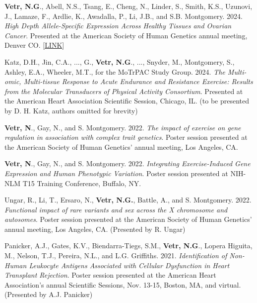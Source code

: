 \documentclass[12pt]{article}
\begin{document}
\begin{enumerate}[label={[\arabic*]}]

\item \textbf{Vetr, N.G}., Abell, N.S., Tsang, E., Cheng, N., Linder, S., Smith, K.S., Uzunovi, J., Lamaze, F., Ardlie, K., Awadalla, P., Li, J.B., and S.B. Montgomery. 2024. \emph{High Depth Allele-Specific Expression Across Healthy Tissues and Ovarian Cancer}. Presented at the American Society of Human Genetics annual meeting, Denver CO. [\href{https://drive.google.com/file/d/15JSeHtKpoYTcL5_PG1dS9q7A-rwfBjP_/view?usp=sharing}{LINK}]
\item Katz, D.H., Jin, C.A., ..., G., \textbf{Vetr, N.G}., ..., Snyder, M., Montgomery, S., Ashley, E.A., Wheeler, M.T., for the MoTrPAC Study Group. 2024. \emph{The Multi-omic, Multi-tissue Response to Acute Endurance and Resistance Exercise: Results from the Molecular Transducers of Physical Activity Consortium}. Presented at the American Heart Association Scientific Session, Chicago, IL. (to be presented by D. H. Katz, authors omitted for brevity)

\item \textbf{Vetr, N}., Gay, N., and S. Montgomery. 2022. \emph{The impact of exercise on gene regulation in association with complex trait genetics}. Poster session presented at the American Society of Human Genetics' annual meeting, Los Angeles, CA.

\item \textbf{Vetr, N}., Gay, N., and S. Montgomery. 2022. \emph{Integrating Exercise-Induced Gene Expression and Human Phenotypic Variation}. Poster session presented at NIH-NLM T15 Training Conference, Buffalo, NY.

\item Ungar, R., Li, T., Ersaro, N., \textbf{Vetr, N.G.}, Battle, A., and S. Montgomery. 2022. \emph{Functional impact of rare variants and sex across the X chromosome and autosomes}. Poster session presented at the American Society of Human Genetics' annual meeting, Los Angeles, CA. (Presented by R. Ungar)

\item Panicker, A.J., Gates, K.V., Biendarra-Tiegs, S.M., \textbf{Vetr, N.G}., Lopera Higuita, M., Nelson, T.J., Pereira, N.L., and L.G. Griffiths. 2021. \emph{Identification of Non-Human Leukocyte Antigens Associated with Cellular Dysfunction in Heart Transplant Rejection}. Poster session presented at the American Heart Association’s annual Scientific Sessions, Nov. 13-15, Boston, MA, and virtual. (Presented by A.J. Panicker)


\end{enumerate}
\end{document}
